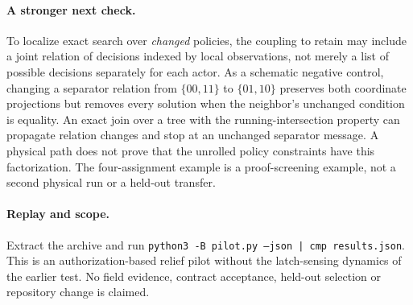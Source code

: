 \documentclass[11pt]{article}
\begin{document}
\paragraph{A stronger next check.}
To localize exact search over \emph{changed} policies, the coupling to retain may include a joint relation of decisions indexed by local observations, not merely a list of possible decisions separately for each actor. As a schematic negative control, changing a separator relation from \(\{00,11\}\) to \(\{01,10\}\) preserves both coordinate projections but removes every solution when the neighbor's unchanged condition is equality. An exact join over a tree with the running-intersection property can propagate relation changes and stop at an unchanged separator message. A physical path does not prove that the unrolled policy constraints have this factorization. The four-assignment example is a proof-screening example, not a second physical run or a held-out transfer.

\paragraph{Replay and scope.}
Extract the archive and run \texttt{python3 -B pilot.py --json | cmp results.json}. This is an authorization-based relief pilot without the latch-sensing dynamics of the earlier test. No field evidence, contract acceptance, held-out selection or repository change is claimed.
\end{document}
